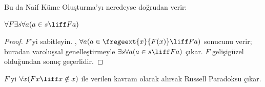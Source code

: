Bu da Naif Küme Oluşturma'yı neredeyse doğrudan verir:

\begin{lem}
$\forall F \exists s \forall a (a \in s \liff Fa)$
\end{lem}

\begin{proof}
$F$'yi sabitleyin. ,
$\forall a(a\in\fregeext{x}{F(x)}\liff Fa)$ sonucunu verir; buradan varoluşsal
genelleştirmeyle $\exists s\forall a(a\in s\liff Fa)$ çıkar. $F$ gelişigüzel
olduğundan sonuç geçerlidir.
\end{proof}

$F$'yi $\forall x(Fx\liff x\notin x)$ ile verilen kavram olarak alırsak
Russell Paradoksu çıkar.


